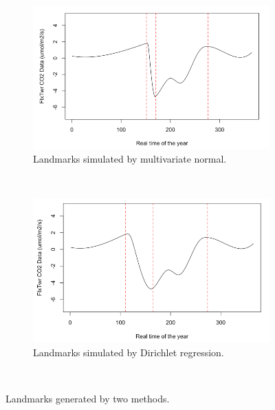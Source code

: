 \documentclass{article}\usepackage[]{graphicx}\usepackage[]{color}
\begin{document}
\begin{figure}[!ht]
    \centering
    \begin{subfigure}[ht]{0.45\textwidth}
        \includegraphics[width=\textwidth]{BadS2.png}
        \caption{Landmarks simulated by multivariate normal.}\label{Fig:BadS}
    \end{subfigure}
    ~ %
    \begin{subfigure}[ht]{0.45\textwidth}
        \includegraphics[width=\textwidth]{GoodS2.png}
        \caption{Landmarks simulated by Dirichlet regression.}\label{Fig:GoodS}
    \end{subfigure}
        ~ %
    \caption{Landmarks generated by two methods.}\label{Fig:landCom}
\end{figure}
\end{document}
